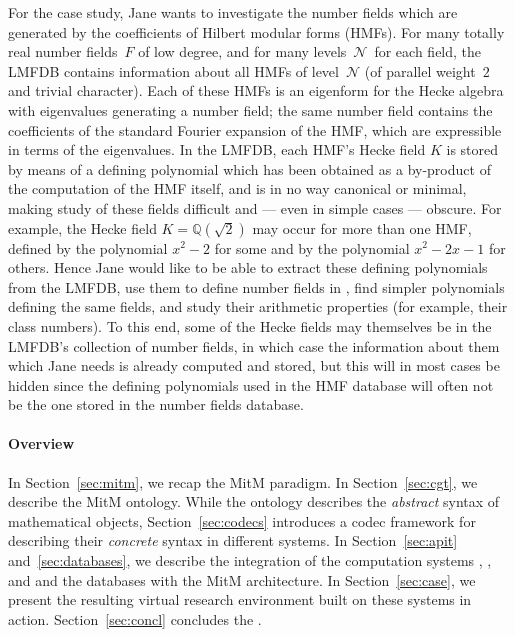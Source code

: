 \def\Q{{\mathbb Q}}
\def\N{{\mathcal{N}}}
For the \LMFDB case study, Jane wants to investigate the number fields which are generated by the coefficients of Hilbert modular forms (HMFs).
For many totally real number fields~$F$ of low degree, and for many levels~$\N$\ for each field, the LMFDB contains information about all HMFs of level~$\N$ (of parallel weight~$2$ and trivial character).
Each of these HMFs is an eigenform for the Hecke algebra with eigenvalues generating a number field; the same number field contains the coefficients of the standard Fourier expansion of the HMF, which are expressible in terms of the eigenvalues.
In the LMFDB, each HMF's Hecke field $K$ is stored by means of a defining polynomial which has been obtained as a by-product of the computation of the HMF itself, and is in no way canonical or minimal, making study of these fields difficult and --- even in simple cases --- obscure.
For example, the Hecke field $K=\Q(\sqrt{2})$ may occur for more than one HMF, defined by the polynomial $x^2-2$ for some and by the polynomial $x^2-2x-1$ for others.
Hence Jane would like to be able to extract these defining polynomials from the LMFDB, use them to define number fields in \Sage, find simpler polynomials defining the same fields, and study their arithmetic properties (for example, their class numbers).
To this end, some of the Hecke fields may themselves be in the LMFDB's collection of number fields, in which case the information about them which Jane needs is already computed and stored, but this will in most cases be hidden since the defining polynomials used in the HMF database will often not be the one stored in the number fields database.

\paragraph{Overview}
In Section~\ref{sec:mitm}, we recap the MitM paradigm.
In Section~\ref{sec:cgt}, we describe the MitM ontology.
While the ontology describes the \emph{abstract} syntax of mathematical objects, Section~\ref{sec:codecs} introduces a codec framework for describing their \emph{concrete} syntax in different systems.
In Section~\ref{sec:apit} and~\ref{sec:databases}, we describe the integration of the computation systems \GAP, \Sage, and \Singular and the \lmfdb databases with the MitM architecture.
In Section~\ref{sec:case}, we present the resulting virtual research environment built on
these systems in action.
Section~\ref{sec:concl} concludes the \papertype.

